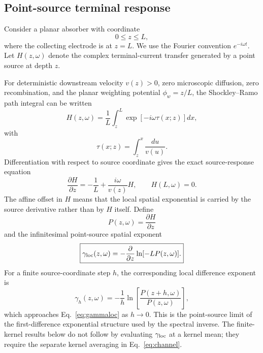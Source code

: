 \documentclass[aps,pra,twocolumn,superscriptaddress,nofootinbib]{revtex4-2}
\begin{document}
\subsection{Point-source terminal response}

Consider a planar absorber with coordinate
\begin{equation}
0\le z\le L,
\end{equation}
where the collecting electrode is at $z=L$. We use the Fourier convention $e^{-i\omega t}$. Let $H(z,\omega)$ denote the complex terminal-current transfer generated by a point source at depth $z$.

For deterministic downstream velocity $v(z)>0$, zero microscopic diffusion, zero recombination, and the planar weighting potential $\phi_w=z/L$, the Shockley--Ramo path integral \cite{shockley1938,ramo1939} can be written
\begin{equation}
H(z,\omega)
=\frac{1}{L}\int_z^L
\exp\left[-i\omega\tau(x;z)\right]dx,
\label{eq:Hpath}
\end{equation}
with
\begin{equation}
\tau(x;z)=\int_z^x\frac{du}{v(u)}.
\end{equation}
Differentiation with respect to source coordinate gives the exact source-response equation
\begin{equation}
\boxed{
\frac{\partial H}{\partial z}
=-\frac{1}{L}+\frac{i\omega}{v(z)}H,
\qquad H(L,\omega)=0.
}
\label{eq:ramoode}
\end{equation}
The affine offset in $H$ means that the local spatial exponential is carried by the source derivative rather than by $H$ itself. Define
\begin{equation}
P(z,\omega)=\frac{\partial H}{\partial z}
\end{equation}
and the infinitesimal point-source spatial exponent
\begin{equation}
\boxed{
\gamma_{\rm loc}(z,\omega)
=-\frac{\partial}{\partial z}
\ln[-L P(z,\omega)].
}
\label{eq:gammaloc}
\end{equation}
For a finite source-coordinate step $h$, the corresponding local difference exponent is
\begin{equation}
\gamma_h(z,\omega)
=-\frac{1}{h}
\ln\!\left[\frac{P(z+h,\omega)}{P(z,\omega)}\right],
\end{equation}
which approaches Eq.~\eqref{eq:gammaloc} as $h\rightarrow0$.  This is the point-source limit of the first-difference exponential structure used by the spectral inverse.  The finite-kernel results below do not follow by evaluating $\gamma_{\rm loc}$ at a kernel mean; they require the separate kernel averaging in Eq.~\eqref{eq:channel}.
\end{document}
